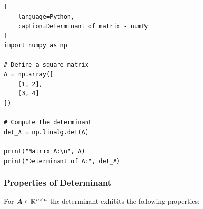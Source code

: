 \begin{lstlisting}[
    language=Python,
    caption=Determinant of matrix - numPy
]
import numpy as np

# Define a square matrix
A = np.array([
    [1, 2],
    [3, 4]
])

# Compute the determinant
det_A = np.linalg.det(A)

print("Matrix A:\n", A)
print("Determinant of A:", det_A)
\end{lstlisting}




\subsubsection{Properties of Determinant}

For $\bm{A} \in \mathbb{R}^{n\times n}$ the determinant exhibits the following properties:
\hfill \cite{mfml/book/mml/Deisenroth-Faisal-Ong}

